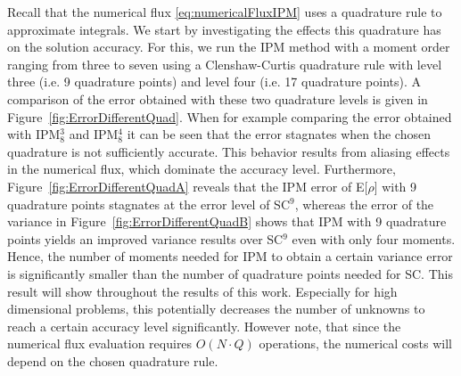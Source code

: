 Recall that the numerical flux \eqref{eq:numericalFluxIPM} uses a quadrature rule to approximate integrals. We start by investigating the effects this quadrature has on the solution accuracy. For this, we run the IPM method with a moment order ranging from three to seven using a Clenshaw-Curtis quadrature rule with level three (i.e. 9 quadrature points) and level four (i.e. 17 quadrature points). A comparison of the error obtained with these two quadrature levels is given in Figure~\ref{fig:ErrorDifferentQuad}. When for example comparing the error obtained with IPM$_8^3$ and IPM$_8^4$ it can be seen that the error stagnates when the chosen quadrature is not sufficiently accurate. This behavior results from aliasing effects in the numerical flux, which dominate the accuracy level. Furthermore, Figure~\ref{fig:ErrorDifferentQuadA} reveals that the IPM error of E[$\rho$] with 9 quadrature points stagnates at the error level of SC$^9$, whereas the error of the variance in Figure~\ref{fig:ErrorDifferentQuadB} shows that IPM with 9 quadrature points yields an improved variance results over SC$^9$ even with only four moments. Hence, the number of moments needed for IPM to obtain a certain variance error is significantly smaller than the number of quadrature points needed for SC. This result will show throughout the results of this work. Especially for high dimensional problems, this potentially decreases the number of unknowns to reach a certain accuracy level significantly. However note, that since the numerical flux evaluation requires $O(N\cdot Q)$ operations, the numerical costs will depend on the chosen quadrature rule.

